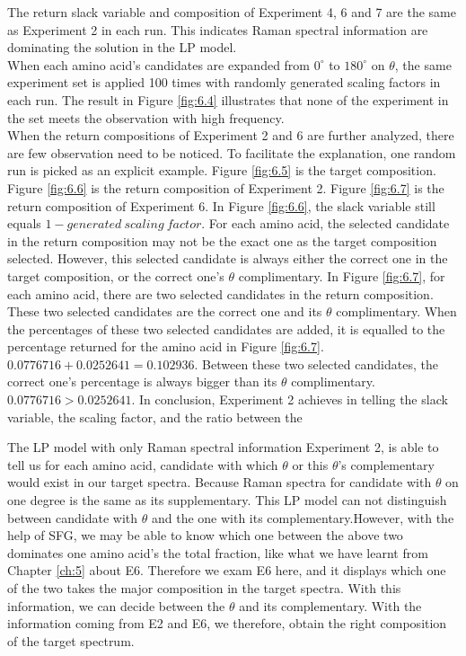 The return slack variable and composition of Experiment 4, 6 and 7 are the same as Experiment 2 in each run. This indicates Raman spectral information are dominating the solution in the LP model. \\


When each amino acid's candidates are expanded from $0^{\circ}$ to $180^{\circ}$ on $\theta$, the same experiment set is applied 100 times with randomly generated scaling factors in each run. The result in Figure \ref{fig:6.4} illustrates that none of the experiment in the set meets the observation with high frequency. \\

When the return compositions of Experiment 2 and 6 are further analyzed, there are few observation need to be noticed. To facilitate the explanation, one random run is picked as an explicit example. Figure \ref{fig:6.5} is the target composition. Figure \ref{fig:6.6} is the return composition of Experiment 2. Figure \ref{fig:6.7} is the return composition of Experiment 6. In Figure \ref{fig:6.6}, the slack variable still equals $1 - generated~scaling~factor$. For each amino acid, the selected candidate in the return composition may not be the exact one as the target composition selected. However, this selected candidate is always either the correct one in the target composition, or the correct one's $\theta$ complimentary. In Figure \ref{fig:6.7}, for each amino acid, there are two selected candidates in the return composition. These two selected candidates are the correct one and its $\theta$ complimentary. When the percentages of these two selected candidates are added, it is equalled to the percentage returned for the amino acid in Figure \ref{fig:6.7}. $0.0776716 + 0.0252641 = 0.102936$. Between these two selected candidates, the correct one's percentage is always bigger than its $\theta$ complimentary. $0.0776716 > 0.0252641$. In conclusion, Experiment 2 achieves in telling the slack variable, the scaling factor, and the ratio between the 

The LP model with only Raman spectral information Experiment 2, is able to tell us for each amino acid, candidate with which $\theta$ or this $\theta$'s complementary would exist in our target spectra. Because Raman spectra for candidate with $\theta$ on one degree is the same as its supplementary. This LP model can not distinguish between candidate with $\theta$ and the one with its complementary.However, with the help of SFG, we may be able to know which one between the above two dominates one amino acid's the total fraction, like what we have learnt from Chapter \ref{ch:5} about E6. Therefore we exam E6 here, and it displays which one of the two takes the major composition in the target spectra. With this information, we can decide between the $\theta$ and its complementary. 
With the information coming from E2 and E6, we therefore, obtain the right composition of the target spectrum.\\

